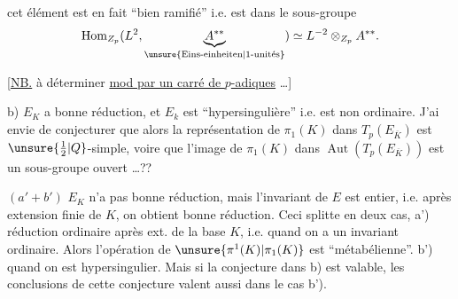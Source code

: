  cet  élément est en fait ``bien ramifié'' i.e. est dans le sous-groupe
\[
\operatorname{Hom}_{Z_p}(L^2,\underbrace{A^{**}}_{\text{\unsure{Eins-einheiten|1-unités}}})\simeq L^{-2}\otimes_{Z_p}A^{**}.
\]

[\uline{NB.}  à déterminer \uline{mod   par un carré de   $p$-adiques} \dots]


b) $E_K$ a bonne réduction, et $E_k$ est ``hypersingulière'' i.e. est non ordinaire. J'ai envie de conjecturer que alors la représentation de $\pi_1(K)$ dans $T_p(E_{\overline K})$ est $\unsure{\frac12|Q}$-simple, voire que l'image de $\pi_1(K)$ dans $\operatorname{Aut}(T_p(E_{\overline K}))$ est un sous-groupe ouvert \dots ??

$(a'+b')$ $E_K$ n'a pas  bonne réduction, mais l'invariant de $E$ est entier, i.e. après extension finie de $K$, on obtient bonne réduction. Ceci splitte en deux cas, a') réduction ordinaire après ext. de la base $K$, i.e. quand on a un invariant ordinaire. Alors l'opération de $\unsure{\pi^1(K)|\pi_1(K)}$ est ``métabélienne''. b') quand on est hypersingulier. Mais  si la conjecture dans b) est valable, les conclusions de cette conjecture valent aussi dans le cas b').
